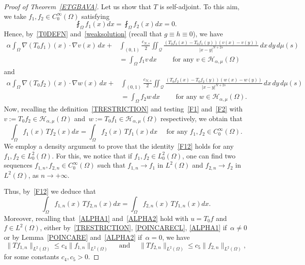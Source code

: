 \documentclass[12pt,a4paper,intlimits,sumlimits]{amsart}
\def \Q {\mathcal Q}
\theoremstyle{definition}
\theoremstyle{plain}
\numberwithin{equation}{section}
\renewcommand{\le}{\leqslant}
\begin{document}
\begin{proof}[Proof of Theorem~\ref{ETGBAVA}]
Let us show that $T$ is self-adjoint. To this aim, we take $f_1, f_2\in C_0^\infty(\Omega)$ satisfying
\[
\fint_\Omega f_1(x) dx = \fint_\Omega f_2(x) dx =0.
\]
Hence, by~\eqref{T0DEFN} and~\eqref{weaksolution} (recall that $g\equiv h\equiv 0$), we have
\begin{equation}\label{F1}
\begin{split}
\alpha\int_\Omega \nabla (T_0 f_1)(x)\cdot \nabla v(x) \,dx + &\int_{(0, 1)} \frac{c_{N, s}}{2} \iint_{\Q} \frac{(T_0 f_1(x)-T_0 f_1(y))(v(x) -v(y))}{|x-y|^{N+2s}} \,dx\,dy\, d\mu(s)\\
& = \int_\Omega f_1 v \,dx \qquad\mbox{ for any } v\in \mathcal H_{\alpha, \mu}(\Omega)
\end{split}
\end{equation}
and 
\begin{equation}\label{F2}
\begin{split}
\alpha\int_\Omega \nabla (T_0 f_2)(x)\cdot \nabla w(x)\, dx + &\int_{(0, 1)} \frac{c_{N, s}}{2} \iint_{\Q} \frac{(T_0 f_2(x)-T_0 f_2(y))(w(x) -w(y))}{|x-y|^{N+2s}}\, dx\,dy\, d\mu(s)\\
& = \int_\Omega f_2 w\, dx \qquad\mbox{ for any } w\in \mathcal H_{\alpha, \mu}(\Omega).
\end{split}
\end{equation}
Now, recalling the definition~\eqref{TRESTRICTION} and testing~\eqref{F1} and~\eqref{F2} with~$v:= T_0 f_2\in \mathcal H_{\alpha, \mu}(\Omega)$ and~$w:= T_0 f_1\in \mathcal H_{\alpha, \mu}(\Omega)$ respectively, we obtain that
\begin{equation}\label{F12}
\int_\Omega f_1(x) \, T f_2(x) dx = \int_\Omega f_2(x) \, T f_1(x) dx \quad\mbox{ for any } f_1, f_2\in C_0^\infty(\Omega).
\end{equation}
We employ a density argument to prove that the identity~\eqref{F12} holds for any $f_1, f_2\in L_0^2(\Omega)$. For this, we notice that if $f_1, f_2\in L_0^2(\Omega)$, one can find two sequences $f_{1, n}, f_{2, n}\in C_0^\infty(\Omega)$ such that $f_{1, n}\to f_1$ in $L^2(\Omega)$ and $f_{2, n}\to f_2$ in $L^2(\Omega)$, as $n\to +\infty$. 

Thus, by~\eqref{F12} we deduce that
\begin{equation}\label{F12K}
\int_\Omega f_{1, n} (x) \, T f_{2, n}(x) dx = \int_\Omega f_{2, n}(x) \, T f_{1, n}(x) dx.
\end{equation}
Moreover, recalling that~\eqref{ALPHA1} and~\eqref{ALPHA2} hold with $u=T_0 f$ and $f\in L^2(\Omega)$,  either by~\eqref{TRESTRICTION}, \eqref{POINCARECL}, \eqref{ALPHA1} if~$\alpha\neq 0$ or by Lemma~\ref{POINCARE} and~\eqref{ALPHA2} if~$\alpha =0$, we have
\[
\|T f_{1, n}\|_{L^2(\Omega)}\le c_4 \|f_{1, n}\|_{L^2(\Omega)} \quad\mbox{ and }\quad \|T f_{2, n}\|_{L^2(\Omega)}\le c_5 \|f_{2, n}\|_{L^2(\Omega)},
\]
for some constants $c_4, c_5>0$.


\end{proof}
\end{document}
